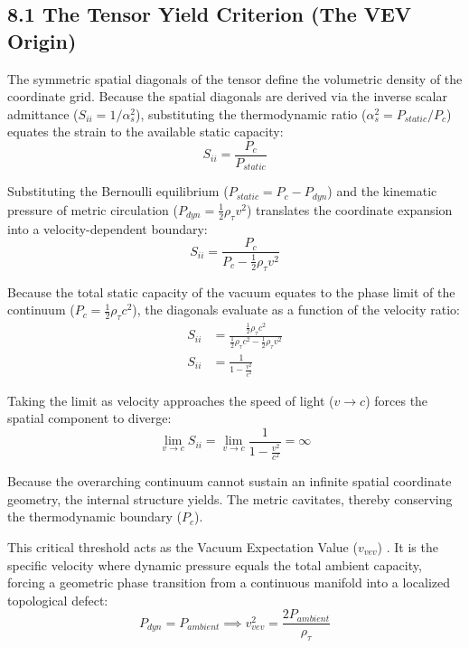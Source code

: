\subsection*{8.1 The Tensor Yield Criterion (The VEV Origin)}
The symmetric spatial diagonals of the tensor define the volumetric density of the coordinate grid. Because the spatial diagonals are derived via the inverse scalar admittance ($S_{ii} = 1/\alpha_s^2$), substituting the thermodynamic ratio ($\alpha_s^2 = P_{static}/P_c$) equates the strain to the available static capacity: 
\begin{equation}
    S_{ii} = \frac{P_c}{P_{static}}
\end{equation}

Substituting the Bernoulli equilibrium ($P_{static} = P_c - P_{dyn}$) and the kinematic pressure of metric circulation ($P_{dyn} = \frac{1}{2}\rho_\tau v^2$) translates the coordinate expansion into a velocity-dependent boundary:
\begin{equation}
    S_{ii} = \frac{P_c}{P_c - \frac{1}{2}\rho_\tau v^2}
\end{equation}

Because the total static capacity of the vacuum equates to the phase limit of the continuum ($P_c = \frac{1}{2}\rho_\tau c^2$), the diagonals evaluate as a function of the velocity ratio: 
\begin{align}
    S_{ii} &= \frac{\frac{1}{2}\rho_\tau c^2}{\frac{1}{2}\rho_\tau c^2 - \frac{1}{2}\rho_\tau v^2} \nonumber \\
    S_{ii} &= \frac{1}{1 - \frac{v^2}{c^2}} \label{eq:spatial_diagonal_lorentz}
\end{align}

Taking the limit as velocity approaches the speed of light ($v \to c$) forces the spatial component to diverge:
\begin{equation}
    \lim_{v \to c} S_{ii} = \lim_{v \to c} \frac{1}{1 - \frac{v^2}{c^2}} = \infty \label{eq:tensor_divergence_limit}
\end{equation}


Because the overarching continuum cannot sustain an infinite spatial coordinate geometry, the internal structure yields. The metric cavitates, thereby conserving the thermodynamic boundary ($P_c$). 

This critical threshold acts as the Vacuum Expectation Value ($v_{vev}$) \cite{Volovik2003}. It is the specific velocity where dynamic pressure equals the total ambient capacity, forcing a geometric phase transition from a continuous manifold into a localized topological defect: 
\begin{equation}
    P_{dyn} = P_{ambient} \implies v_{vev}^2 = \frac{2 P_{ambient}}{\rho_\tau} \label{eq:tensor_vev}
\end{equation}


